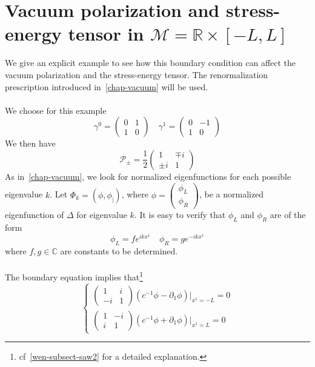 \section{Vacuum polarization and stress-energy tensor in $\mathcal{M} = \mathbb R \times [-L, L]$ }\label{wen-sect-ex1d}
We give an explicit example to see how this boundary condition can affect the vacuum polarization and the stress-energy tensor. 
The renormalization prescription introduced in~\cref{chap-vacuum} will be used.\\\\
We choose for this example
\begin{equation*}
\gamma^0 = \begin{pmatrix} 0 & 1 \\ 1 & 0 \end{pmatrix} \quad
\gamma^1 = \begin{pmatrix} 0 & -1 \\ 1 & 0 \end{pmatrix}
\end{equation*}
We then have 
\begin{equation*}
 \mathcal{P}_\pm = \frac 1 2  \begin{pmatrix} 1 & \mp i \\ \pm i & 1 \end{pmatrix}
\end{equation*}
As in~\cref{chap-vacuum}, 
we look for normalized eigenfunctions for each possible eigenvalue $k$.
Let $\Phi_k = (\phi, \phi_|)$, where $\phi = \begin{pmatrix} \phi_L \\ \phi_R \end{pmatrix}$,
be a normalized eigenfunction of $\Delta$ for eigenvalue $k$. 
It is easy to verify that $\phi_L$ and $\phi_R$ are of the form
\begin{equation*}
\phi_L = f e^{ik x^1} \quad
\phi_R = g e^{-ik x^1}
\end{equation*}
where $f, g\in\mathbb C$ are constants to be determined. \\\\
The boundary equation implies that\footnote{
cf~\cref{wen-subsect-saw2} for a detailed explanation.
} 
\begin{equation*}
\begin{cases}
\begin{pmatrix} 1 & i \\ -i & 1 \end{pmatrix}(c^{-1} \phi - \partial_1 \phi)\vert_{x^1 = -L} = 0 \\
%
\begin{pmatrix} 1 & -i \\ i & 1 \end{pmatrix}(c^{-1} \phi + \partial_1 \phi)\vert_{x^1 = L} = 0
\end{cases}
\end{equation*}
